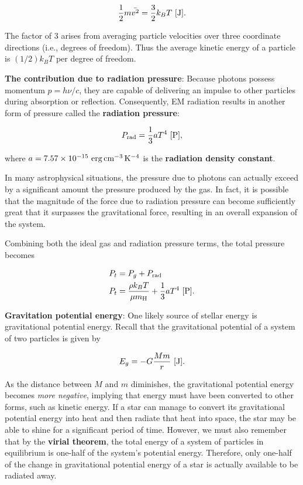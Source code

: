 \documentclass[a4paper,10pt]{article}
\begin{document}
\begin{align*}
    \frac{1}{2}m\bar{v^2} = \frac{3}{2}k_BT ~ [{\rm J}].
\end{align*}

{\noindent}The factor of $3$ arises from averaging particle velocities over three coordinate directions (i.e., degrees of freedom). Thus the average kinetic energy of a particle is $(1/2)k_BT$ per degree of freedom.

{\noindent}\textbf{The contribution due to radiation pressure}: Because photons possess momentum $p=h\nu/c$, they are capable of delivering an impulse to other particles during absorption or reflection. Consequently, EM radiation results in another form of pressure called the \textbf{radiation pressure}: 

\begin{align*}
    P_{\rm rad} = \frac{1}{3}aT^4 ~ [{\rm P}],
\end{align*}

{\noindent}where $a=7.57\times10^{-15}~{\rm erg\,cm^{-3}\,K^{-4}}$ is the \textbf{radiation density constant}.

{\noindent}In many astrophysical situations, the pressure due to photons can actually exceed by a significant amount the pressure produced by the gas. In fact, it is possible that the magnitude of the force due to radiation pressure can become sufficiently great that it surpasses the gravitational force, resulting in an overall expansion of the system.

{\noindent}Combining both the ideal gas and radiation pressure terms, the total pressure becomes

\begin{align*}
    P_t &= P_g + P_{\rm rad} \\
    P_t &= \frac{\rho k_BT}{\mu m_{\rm H}} + \frac{1}{3}aT^4 ~ [{\rm P}].
\end{align*}

{\noindent}\textbf{Gravitation potential energy}: One likely source of stellar energy is gravitational potential energy. Recall that the gravitational potential of a system of two particles is given by

\begin{align*}
    E_g = -G\frac{Mm}{r} ~ [{\rm J}].
\end{align*}

{\noindent}As the distance between $M$ and $m$ diminishes, the gravitational potential energy becomes \textit{more negative}, implying that energy must have been converted to other forms, such as kinetic energy. If a star can manage to convert its gravitational potential energy into heat and then radiate that heat into space, the star may be able to shine for a significant period of time. However, we must also remember that by the \textbf{virial theorem}, the total energy of a system of particles in equilibrium is one-half of the system's potential energy. Therefore, only one-half of the change in gravitational potential energy of a star is actually available to be radiated away.
\end{document}
